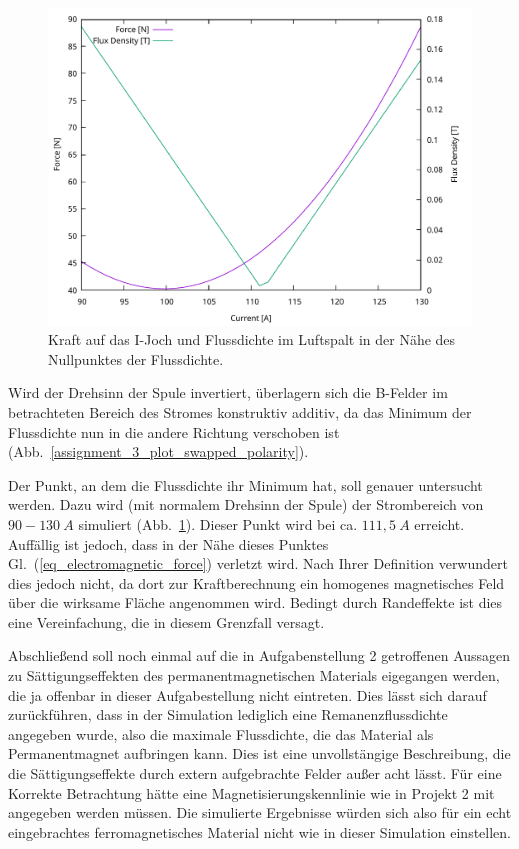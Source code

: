 \documentclass[conference,a4paper,twoside]{IEEEtran}
\begin{document}
\begin{figure}
\centerline{\includegraphics[width=\columnwidth]{../assets/assignment_3_plot_zero.pdf}}
\caption{Kraft auf das I-Joch und Flussdichte im Luftspalt in der Nähe des Nullpunktes der Flussdichte.}
\label{assignment_3_plot_zero}
\end{figure}

Wird der Drehsinn der Spule invertiert, überlagern sich die B-Felder im betrachteten Bereich des Stromes konstruktiv additiv, da das Minimum der Flussdichte nun in die andere Richtung verschoben ist (Abb.~\ref{assignment_3_plot_swapped_polarity}).

Der Punkt, an dem die Flussdichte ihr Minimum hat, soll genauer untersucht werden. Dazu wird (mit normalem Drehsinn der Spule) der Strombereich von $90 - 130\ A$ simuliert (Abb.~\ref{assignment_3_plot_zero}). Dieser Punkt wird bei ca. $111,5\ A$ erreicht. Auffällig ist jedoch, dass in der Nähe dieses Punktes Gl.~(\ref{eq_electromagnetic_force}) verletzt wird. Nach Ihrer Definition verwundert dies jedoch nicht, da dort zur Kraftberechnung ein homogenes magnetisches Feld über die wirksame Fläche angenommen wird. Bedingt durch Randeffekte ist dies eine Vereinfachung, die in diesem Grenzfall versagt.

Abschließend soll noch einmal auf die in Aufgabenstellung 2 getroffenen Aussagen zu Sättigungseffekten des permanentmagnetischen Materials eigegangen werden, die ja offenbar in dieser Aufgabestellung nicht eintreten. Dies lässt sich darauf zurückführen, dass in der Simulation lediglich eine Remanenzflussdichte angegeben wurde, also die maximale Flussdichte, die das Material als Permanentmagnet aufbringen kann. Dies ist eine unvollstängige Beschreibung, die die Sättigungseffekte durch extern aufgebrachte Felder außer acht lässt. Für eine Korrekte Betrachtung hätte eine Magnetisierungskennlinie wie in Projekt 2 mit angegeben werden müssen. Die simulierte Ergebnisse würden sich also für ein echt eingebrachtes ferromagnetisches Material nicht wie in dieser Simulation einstellen.
\end{document}
